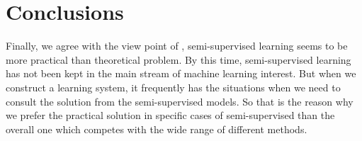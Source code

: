 \section{Conclusions}
Finally, we agree with the view point of \citeauthor{Olivier2006} \parencite{Olivier2006}, semi-supervised learning seems to be more practical than theoretical problem. By this time, semi-supervised learning has not been kept in the main stream of machine learning interest. But when we construct a learning system, it frequently has the situations when we need to consult the solution from the semi-supervised models. So that is the reason why we prefer the practical solution in specific cases of semi-supervised than the overall one which competes with the wide range of different methods.